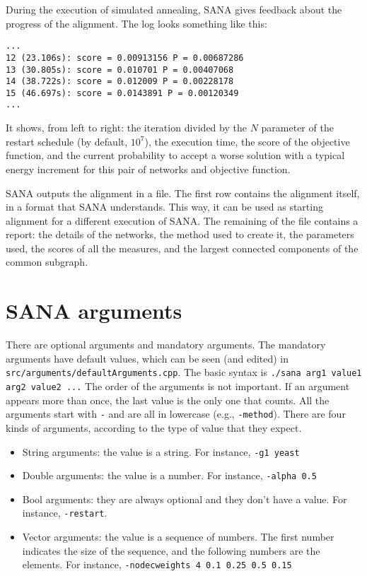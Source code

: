 \documentclass[]{article}
\begin{document}
During the execution of simulated annealing, SANA gives feedback about the progress of the alignment. The log looks something like this:
\begin{verbatim}
...
12 (23.106s): score = 0.00913156 P = 0.00687286
13 (30.805s): score = 0.010701 P = 0.00407068
14 (38.722s): score = 0.012009 P = 0.00228178
15 (46.697s): score = 0.0143891 P = 0.00120349
...
\end{verbatim}
It shows, from left to right: the iteration divided by the $N$ parameter of the restart schedule (by default, $10^7$), the execution time, the score of the objective function, and the current probability to accept a worse solution with a typical energy increment for this pair of networks and objective function.
 
SANA outputs the alignment in a file. The first row contains the alignment itself, in a format that SANA understands. This way, it can be used as starting alignment for a different execution of SANA. The remaining of the file contains a report: the details of the networks, the method used to create it, the parameters used, the scores of all the measures, and the largest connected components of the common subgraph.


\section{SANA arguments}\label{b:args}
There are optional arguments and mandatory arguments. The mandatory arguments have default values, which can be seen (and edited) in \texttt{src/arguments/defaultArguments.cpp}. The basic syntax is \texttt{./sana arg1 value1 arg2 value2 ...} The order of the arguments is not important. If an argument appears more than once, the last value is the only one that counts. All the arguments start with \texttt{-} and are all in lowercase (e.g., \texttt{-method}). There are four kinds of arguments, according to the type of value that they expect.
\begin{itemize}
\item String arguments: the value is a string. For instance, \texttt{-g1 yeast}
\item Double arguments: the value is a number. For instance, \texttt{-alpha 0.5}
\item Bool arguments: they are always optional and they don't have a value. For instance, \texttt{-restart}.
\item Vector arguments: the value is a sequence of numbers. The first number indicates the size of the sequence, and the following numbers are the elements. For instance, \texttt{-nodecweights 4 0.1 0.25 0.5 0.15}
\end{itemize}
\end{document}
